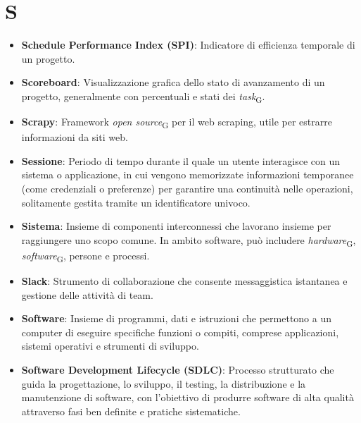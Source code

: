 \section*{S}  
\begin{itemize}
    \item \textbf{Schedule Performance Index (SPI)}: Indicatore di efficienza temporale di un progetto.
    \item \textbf{Scoreboard}: Visualizzazione grafica dello stato di avanzamento di un progetto, generalmente con percentuali e stati dei \textit{task}\textsubscript{G}.
    \item \textbf{Scrapy}: Framework \textit{open source}\textsubscript{G} per il web scraping, utile per estrarre informazioni da siti web.
    \item \textbf{Sessione}: Periodo di tempo durante il quale un utente interagisce con un sistema o applicazione, in cui vengono memorizzate informazioni temporanee (come credenziali o preferenze) per garantire una continuità nelle operazioni, solitamente gestita tramite un identificatore univoco.
    \item \textbf{Sistema}: Insieme di componenti interconnessi che lavorano insieme per raggiungere uno scopo comune. In ambito software, può includere \textit{hardware}\textsubscript{G}, \textit{software}\textsubscript{G}, persone e processi.
    \item \textbf{Slack}: Strumento di collaborazione che consente messaggistica istantanea e gestione delle attività di team.
    \item \textbf{Software}: Insieme di programmi, dati e istruzioni che permettono a un computer di eseguire specifiche funzioni o compiti, comprese applicazioni, sistemi operativi e strumenti di sviluppo.
    \item \textbf{Software Development Lifecycle (SDLC)}: Processo strutturato che guida la progettazione, lo sviluppo, il testing, la distribuzione e la manutenzione di software, con l'obiettivo di produrre software di alta qualità attraverso fasi ben definite e pratiche sistematiche.

\end{itemize}
